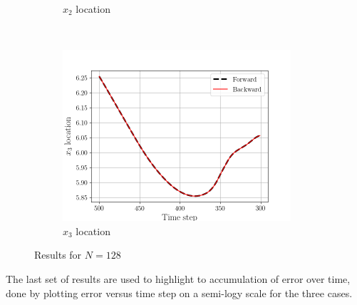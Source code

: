 \begin{figure}[H]
\begin{subfigure}[H]{0.45\textwidth}
        \caption{$x_{2}$ location}
    \end{subfigure}
    ~
    \begin{subfigure}[H]{0.45\textwidth}
        \includegraphics[height=2.5in]{media/rk4/run-128/x3-128-tracking-2.png}
        \caption{$x_{3}$ location}
    \end{subfigure}
    \caption{Results for $N=128$}
    \label{fig:back-tracking-128-2}
\end{figure}
\newpage
The last set of results are used to highlight to accumulation of error over
time, done by plotting error versus time step on a semi-logy scale for the
three cases.
